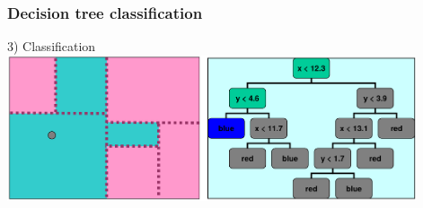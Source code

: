 \documentclass{beamer}
\begin{document}

     



\begin{frame}
    \frametitle{Decision tree classification}
    3) Classification
    \\
    \vspace*{3mm}
    \includegraphics[height=4.3cm,keepaspectratio]{pics/DT_classification.png}%
 
\end{frame}

\end{document}

